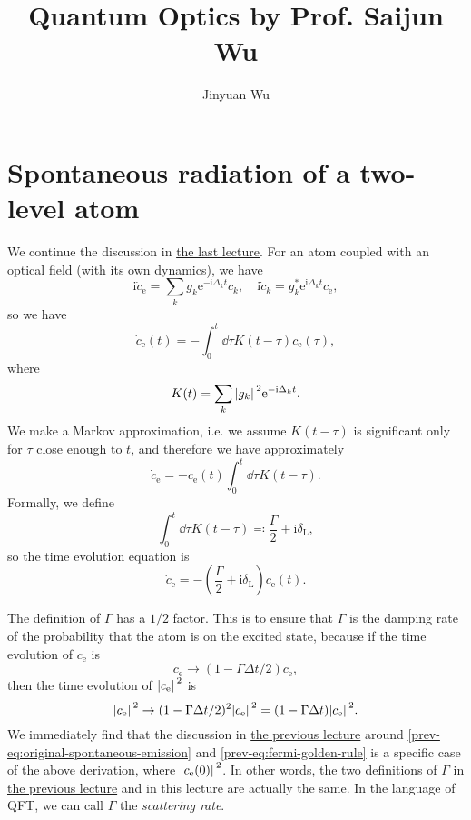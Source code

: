 \documentclass[hyperref, a4paper]{article}
\title{Quantum Optics by Prof. Saijun Wu}
\author{Jinyuan Wu}
\newcommand*{\ii}{\mathrm{i}}
\newcommand*{\ee}{\mathrm{e}}
\newcommand{\prevlecture}{\href{11-18.pdf}{the previous lecture}}
\begin{document}
\maketitle

\section{Spontaneous radiation of a two-level atom}\label{sec:spon-rad}

We continue the discussion in \href{11-18.pdf}{the last lecture}.
For an atom coupled with an optical field (with its own dynamics), we have 
\[
    \ii \dot{c}_\text{e} = \sum_k g_k \ee^{- \ii \Delta_k t} c_k, \quad 
    \ii \dot{c}_k = g_k^* \ee^{\ii \Delta_k t} c_\text{e},
\]
so we have 
\begin{equation}
    \dot{c}_\text{e}(t) = - \int_0^t \dd{\tau} K(t - \tau) c_\text{e}(\tau),
    \label{eq:one-component-eom}
\end{equation}
where 
\begin{equation}
    K(t) = \sum_k \abs*{g_k}^2 \ee^{- \ii \Delta_k t}.
\end{equation}
We make a Markov approximation, i.e. we assume $K(t - \tau)$ is significant only for $\tau$ close enough to $t$,
and therefore we have approximately
\[
    \dot{c}_\text{e} = - c_\text{e}(t) \int_0^t \dd{\tau} K(t - \tau).
\]
Formally, we define 
\begin{equation}
    \int_0^t \dd{\tau} K(t - \tau) \eqqcolon \frac{\Gamma}{2} + \ii \delta_\text{L},
\end{equation}
so the time evolution equation is 
\begin{equation}
    \dot{c}_\text{e} = - \left( \frac{\Gamma}{2} + \ii \delta_\text{L} \right) c_\text{e}(t) .
    \label{eq:markov-eq}
\end{equation}
\begin{note*}{}
    The definition of $\Gamma$ has a $1/2$ factor. This is to ensure that $\Gamma$ is the damping rate of 
    the probability that the atom is on the excited state, because if the time evolution of $c_\text{e}$ is 
    \[
        c_\text{e} \to (1 - \Gamma \Delta t / 2) c_\text{e},
    \]
    then the time evolution of $\abs*{c_\text{e}}^2$ is 
    \[
        \abs*{c_\text{e}}^2 \to (1 - \Gamma \Delta t / 2)^2 \abs*{c_\text{e}}^2 = (1 - \Gamma \Delta t) \abs*{c_\text{e}}^2.
    \]
    We immediately find that the discussion in \prevlecture{} around \eqref{prev-eq:original-spontaneous-emission}
    and \eqref{prev-eq:fermi-golden-rule} is a specific case of the above derivation, where 
    $\abs*{c_\text{e}(0)}^2$. In other words, the two definitions of $\Gamma$ in \prevlecture{} and in this 
    lecture are actually the same. In the language of QFT, we can call $\Gamma$ the \emph{scattering rate}.
\end{note*}
\end{document}
